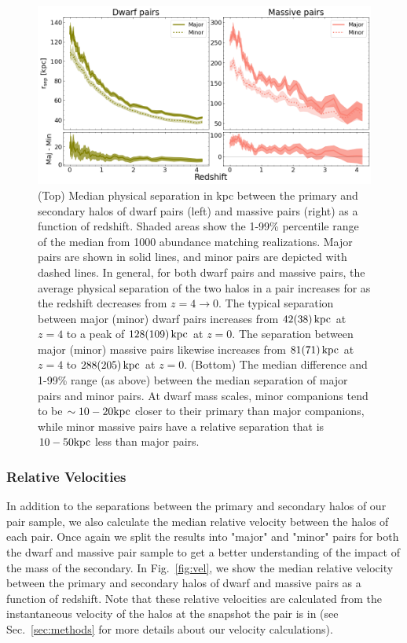 \documentclass[twocolumn]{aastex631}
\begin{document}
    \begin{figure}[htp]
      \centering
      \includegraphics[width=\textwidth]{sep_1000.png}
      \caption{(Top) Median physical separation in kpc between the primary and secondary halos of dwarf pairs (left) and massive pairs (right) as a function of redshift. 
      Shaded areas show the 1-99\% percentile range of the median from 1000 abundance matching realizations. 
      Major pairs are shown in solid lines, and minor pairs are depicted with dashed lines.
      In general, for both dwarf pairs and massive pairs, the average physical separation of the two halos in a pair increases for as the redshift decreases from $z=4\to0$. 
      The typical separation between major (minor) dwarf pairs increases from $42(38)\,\mathrm{kpc}$ at $z=4$ to a peak of $128(109)\,\mathrm{kpc}$ at $z=0$.
      The separation between major (minor) massive pairs likewise increases from $81(71)\,\mathrm{kpc}$ at $z=4$ to $288(205)\,\mathrm{kpc}$ at  $z=0$.
      (Bottom) The median difference and 1-99\% range (as above) between the median separation of major pairs and minor pairs.
      At dwarf mass scales, minor companions tend to be $\sim10-20\mathrm{kpc}$ closer to their primary than major companions, while minor massive pairs have a relative separation that is $10-50\mathrm{kpc}$ less than major pairs.
        }
      \label{fig:sep}
    \end{figure}

    \subsubsection{Relative Velocities}
    In addition to the separations between the primary and secondary halos of our pair sample, we also calculate the median relative velocity between the halos of each pair.
    Once again we split the results into "major" and "minor" pairs for both the dwarf and massive pair sample to get a better understanding of the impact of the mass of the secondary. 
    In Fig.~\ref{fig:vel}, we show the median relative velocity between the primary and secondary halos of dwarf and massive pairs as a function of redshift. 
    Note that these relative velocities are calculated from the instantaneous velocity of the halos at the snapshot the pair is in (see Sec.~\ref{sec:methods} for more details about our velocity calculations).
    
\end{document}
